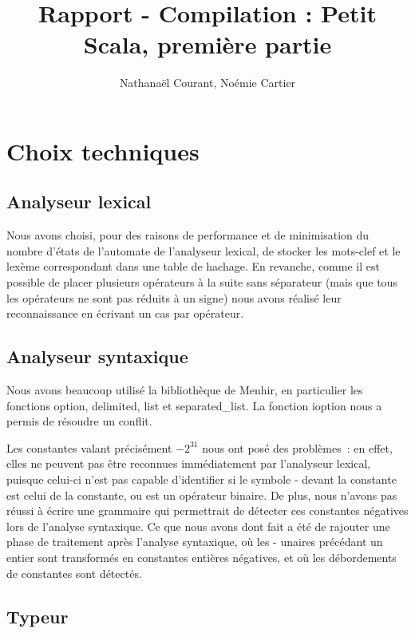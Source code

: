 \documentclass[a4paper,10pt]{article}
\title{Rapport - Compilation : Petit Scala, première partie}
\author{Nathanaël Courant, Noémie Cartier}
\newcommand{\code}[1]{{\fontfamily{pcr}\selectfont #1}}
\begin{document}
\maketitle

\section{Choix techniques}

\subsection{Analyseur lexical}

Nous avons choisi, pour des raisons de performance et de minimisation
du nombre d'états de l'automate de l'analyseur lexical, de stocker les
mots-clef et le lexème correspondant dans une table de hachage. En
revanche, comme il est possible de placer plusieurs opérateurs à la
suite sans séparateur (mais que tous les opérateurs ne sont pas
réduits à un signe) nous avons réalisé leur reconnaissance en écrivant
un cas par opérateur.

\subsection{Analyseur syntaxique}


Nous avons beaucoup utilisé la bibliothèque de Menhir, 
en particulier les fonctions 
\code{option}, \code{delimited}, \code{list} et \code{separated\_{}list}. 
La fonction \code{ioption} nous a permis de résoudre un conflit.

Les constantes valant précisément $-2^{31}$ nous ont posé des
problèmes~: en effet, elles ne peuvent pas être reconnues
immédiatement par l'analyseur lexical, puisque celui-ci n'est pas
capable d'identifier si le symbole \code{-} devant la constante est
celui de la constante, ou est un opérateur binaire. De plus, nous
n'avons pas réussi à écrire une grammaire qui permettrait de détecter
ces constantes négatives lors de l'analyse syntaxique. Ce que nous
avons dont fait a été de rajouter une phase de traitement après
l'analyse syntaxique, où les \code{-} unaires précédant un entier sont
transformés en constantes entières négatives, et où les débordements
de constantes sont détectés.

\subsection{Typeur}
\end{document}
